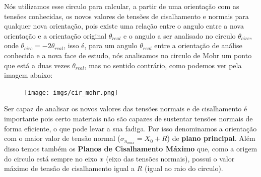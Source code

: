 \documentclass{article}
\begin{document}
Nós utilizamos esse circulo para calcular, a partir de uma orientação com as tensões conhecidas, os novos valores de tensões de cisalhamento e normais para qualquer nova orientação, pois existe uma relação entre o angulo entre a nova orientação e a orientação original $\theta_{real}$ e o angulo a ser analisado no circulo $\theta_{circ}$, onde $\theta_{circ} = -2\theta_{real}$, isso é, para um angulo $\theta_{real}$ entre a orientação de análise conhecida e a nova face de estudo, nós analisamos no circulo de Mohr um ponto que está a duas vezes $\theta_{real}$, mas no sentido contrário, como podemos ver pela imagem abaixo:
\begin{figure}[h]
    \centering
    \texttt{[image: imgs/cir\_mohr.png]}
\end{figure}

Ser capaz de analisar os novos valores das tensões normais e de cisalhamento é importante pois certo materiais não são capazes de sustentar tensões normais de forma eficiente, o que pode levar a sua fadiga. Por isso denominamos a orientação com o maior valor de tensão normal ($ \sigma_{n_{max}} = X_0 + R$) de \textbf{plano principal}. Além disso temos também os \textbf{Planos de Cisalhamento Máximo} que, como a origem do circulo está sempre no eixo $x$ (eixo das tensões normais), possui o valor máximo de tensão de cisalhamento igual a $R$ (igual ao raio do circulo).
\end{document}
